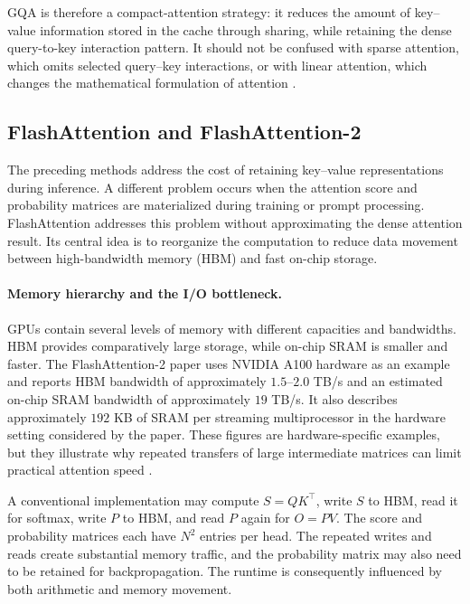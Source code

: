 GQA is therefore a compact-attention strategy: it reduces the amount of
key--value information stored in the cache through sharing, while retaining
the dense query-to-key interaction pattern. It should not be confused
with sparse attention, which omits selected query--key interactions, or
with linear attention, which changes the mathematical formulation of
attention \parencite{ainslie2023gqa,sun2026efficientattention}.

\subsection{FlashAttention and FlashAttention-2}
\label{subsec:attn-flashattention}

The preceding methods address the cost of retaining key--value
representations during inference. A different problem occurs when the
attention score and probability matrices are materialized during training
or prompt processing. FlashAttention addresses this problem without
approximating the dense attention result. Its central idea is to reorganize
the computation to reduce data movement between high-bandwidth memory
(HBM) and fast on-chip storage.

\paragraph{Memory hierarchy and the I/O bottleneck.}
GPUs contain several levels of memory with different capacities and
bandwidths. HBM provides comparatively large storage, while on-chip SRAM
is smaller and faster. The FlashAttention-2 paper uses NVIDIA A100
hardware as an example and reports HBM bandwidth of approximately
\(1.5\)--\(2.0\) TB/s and an estimated on-chip SRAM bandwidth of
approximately \(19\) TB/s. It also describes approximately \(192\) KB
of SRAM per streaming multiprocessor in the hardware setting considered
by the paper. These figures are hardware-specific examples, but they
illustrate why repeated transfers of large intermediate matrices can
limit practical attention speed \parencite{dao2023flashattention2}.

A conventional implementation may compute \(S=QK^\top\), write \(S\)
to HBM, read it for softmax, write \(P\) to HBM, and read \(P\) again
for \(O=PV\). The score and probability matrices each have
\(N^2\) entries per head. The repeated writes and reads create substantial
memory traffic, and the probability matrix may also need to be retained
for backpropagation. The runtime is consequently influenced by both
arithmetic and memory movement.

